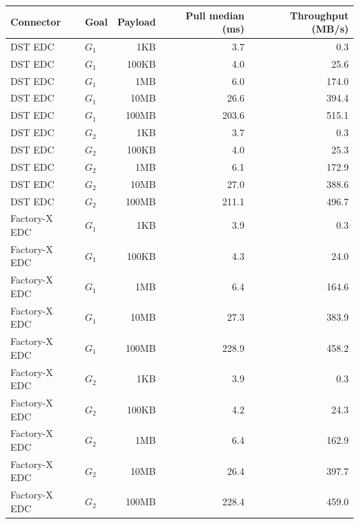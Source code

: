 \begin{tabular}{llrrr}
    \toprule
    Connector & Goal & Payload & Pull median (ms) & Throughput (MB/s) \\
    \midrule
    DST EDC & $G_1$ & 1KB & 3.7 & 0.3 \\
    DST EDC & $G_1$ & 100KB & 4.0 & 25.6 \\
    DST EDC & $G_1$ & 1MB & 6.0 & 174.0 \\
    DST EDC & $G_1$ & 10MB & 26.6 & 394.4 \\
    DST EDC & $G_1$ & 100MB & 203.6 & 515.1 \\
    DST EDC & $G_2$ & 1KB & 3.7 & 0.3 \\
    DST EDC & $G_2$ & 100KB & 4.0 & 25.3 \\
    DST EDC & $G_2$ & 1MB & 6.1 & 172.9 \\
    DST EDC & $G_2$ & 10MB & 27.0 & 388.6 \\
    DST EDC & $G_2$ & 100MB & 211.1 & 496.7 \\
    Factory-X EDC & $G_1$ & 1KB & 3.9 & 0.3 \\
    Factory-X EDC & $G_1$ & 100KB & 4.3 & 24.0 \\
    Factory-X EDC & $G_1$ & 1MB & 6.4 & 164.6 \\
    Factory-X EDC & $G_1$ & 10MB & 27.3 & 383.9 \\
    Factory-X EDC & $G_1$ & 100MB & 228.9 & 458.2 \\
    Factory-X EDC & $G_2$ & 1KB & 3.9 & 0.3 \\
    Factory-X EDC & $G_2$ & 100KB & 4.2 & 24.3 \\
    Factory-X EDC & $G_2$ & 1MB & 6.4 & 162.9 \\
    Factory-X EDC & $G_2$ & 10MB & 26.4 & 397.7 \\
    Factory-X EDC & $G_2$ & 100MB & 228.4 & 459.0 \\
    \bottomrule
\end{tabular}
